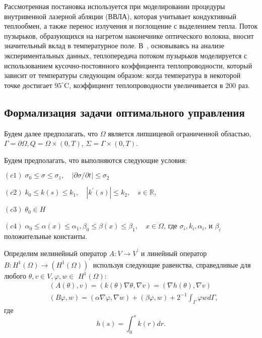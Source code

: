 Рассмотренная постановка используется при
моделировании процедуры внутривенной лазерной абляции (ВВЛА),
которая учитывает кондуктивный теплообмен,
а также перенос излучения и поглощение с выделением тепла.
Поток пузырьков, образующихся на нагретом наконечнике оптического волокна,
вносит значительный вклад в температурное поле.
В~\cite{van2014optical, Some_Poluektova2014, Endovenous_Malskat2014},
основываясь на анализе экспериментальных данных,
теплопередача потоком пузырьков моделируется с использованием кусочно-постоянного
коэффициента теплопроводности, который зависит от температуры следующим образом:
когда температура в некоторой точке достигает $95 ^ {\circ} \mathrm{C}$,
коэффициент теплопроводности увеличивается в $200$ раз.

\subsection{Формализация задачи оптимального управления}
\label{subsec:ch3:sec2:subsec2}

Будем далее предполагать, что $\Omega$ является липшицевой ограниченной областью,
$\Gamma=\partial \Omega, Q=\Omega \times(0, T)$, $\Sigma=\Gamma \times(0, T)$.

Будем предполагать, что выполняются следующие условия:

$(c1)\; \sigma_{0} \leq \sigma \leq \sigma_{1},
\quad|\partial \sigma / \partial t| \leq \sigma_{2}$

$(c2)\; k_{0} \leq k(s) \leq k_{1}, \quad\left|k^{\prime}(s)\right| \leq k_{2},
\quad s \in \mathbb{R}$,

$(c3)\; \theta_{0} \in H$

$(c4)\; \alpha_{0} \leq \alpha(x) \leq \alpha_{1},
\beta_{0} \leq \beta(x) \leq \beta_{1}, \quad x \in \Omega$,
где $\sigma_{i}, k_{i}, \alpha_{i}$, и $\beta_{i}$ положительные константы.

Определим нелинейный оператор $A: V \rightarrow V^{\prime}$ и линейный оператор
$B: H^{1}(\Omega) \rightarrow\left(H^{1}(\Omega)\right)^{\prime}$
используя следующие равенства, справедливые для любого
$\theta, v \in V, \varphi, w \in$ $H^{1}(\Omega)$:
\[
    \begin{aligned}
        &(A(\theta), v)=(k(\theta) \nabla \theta, \nabla v)=(\nabla h(\theta), \nabla v) \\
        &(B \varphi, w)=(\alpha \nabla \varphi, \nabla w)+(\beta \varphi, w)+2^{-1}
        \int_{\Gamma} \varphi w d \Gamma,
    \end{aligned}
\]
где
\[
    h(s)=\int_{0}^{s} k(r) d r.
\]

